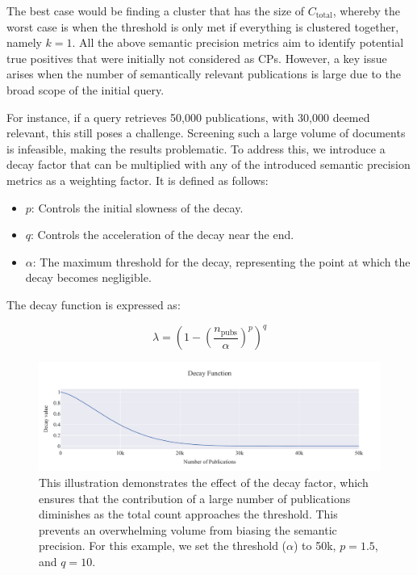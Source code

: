The best case would be finding a cluster that has the size of \( C_{\text{total}} \), whereby the worst case is when the threshold is only met if everything is clustered together, namely $k=1$.
All the above semantic precision metrics aim to identify potential true positives that were initially not considered as CPs. However, a key issue arises when the number of semantically relevant publications is large due to the broad scope of the initial query.

For instance, if a query retrieves 50,000 publications, with 30,000 deemed relevant, this still poses a challenge. Screening such a large volume of documents is infeasible, making the results problematic. To address this, we introduce a decay factor that can be multiplied with any of the introduced semantic precision metrics as a weighting factor. It is defined as follows:

\begin{itemize}
	\item \( p \): Controls the initial slowness of the decay.
	\item \( q \): Controls the acceleration of the decay near the end.
	\item $\alpha$: The maximum threshold for the decay, representing the point at which the decay becomes negligible.
\end{itemize}

The decay function is expressed as:

\[
\lambda = \left(1 - \left(\frac{n_{\text{pubs}}}{\alpha}\right)^p\right)^q
\]


\begin{figure}[h!]
	\hspace*{-1cm}
	\includegraphics[scale=0.45]{pics/decay_function.pdf}
	\caption[Decay Function for Semantic Precision]{This illustration demonstrates the effect of the decay factor, which ensures that the contribution of a large number of publications diminishes as the total count approaches the threshold. This prevents an overwhelming volume from biasing the semantic precision. For this example, we set the threshold (\( \alpha \)) to 50k, \( p=1.5 \), and \( q=10 \).}	
	\label{fig:decay-function}
\end{figure}

